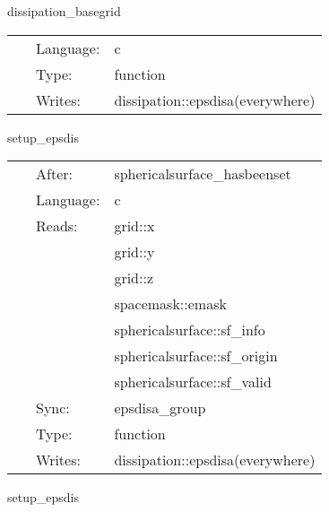 \hspace{5mm} dissipation\_basegrid 

\hspace{5mm}{\it ensure that there are enough ghost zones } 


\hspace{5mm}

 \begin{tabular*}{160mm}{cll} 
~ & Language:  & c \\ 
~ & Type:  & function \\ 
~ & Writes:  & dissipation::epsdisa(everywhere) \\ 
\end{tabular*} 


\vspace{5mm}


\hspace{5mm} setup\_epsdis 

\hspace{5mm}{\it setup spatially varying dissipation } 


\hspace{5mm}

 \begin{tabular*}{160mm}{cll} 
~ & After:  & sphericalsurface\_hasbeenset \\ 
~ & Language:  & c \\ 
~ & Reads:  & grid::x \\ 
~& ~ &grid::y\\ 
~& ~ &grid::z\\ 
~& ~ &spacemask::emask\\ 
~& ~ &sphericalsurface::sf\_info\\ 
~& ~ &sphericalsurface::sf\_origin\\ 
~& ~ &sphericalsurface::sf\_valid\\ 
~ & Sync:  & epsdisa\_group \\ 
~ & Type:  & function \\ 
~ & Writes:  & dissipation::epsdisa(everywhere) \\ 
\end{tabular*} 


\vspace{5mm}


\hspace{5mm} setup\_epsdis 

\hspace{5mm}{\it setup spatially varying dissipation } 


